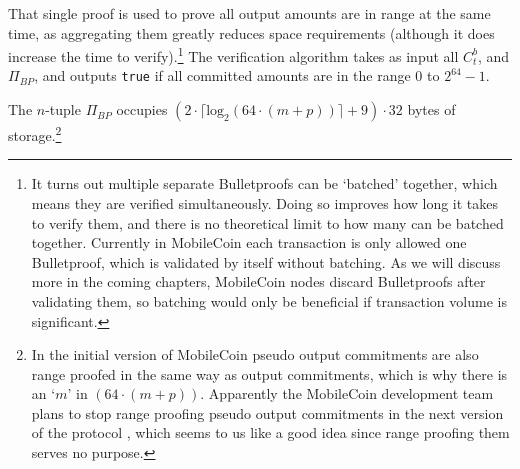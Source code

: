 That single proof is used to prove all output amounts are in range at the same time, as aggregating them greatly reduces space requirements (although it does increase the time to verify).\footnote{It turns out multiple separate Bulletproofs can be `batched' together, which means they are verified simultaneously. Doing so improves how long it takes to verify them, and there is no theoretical limit to how many can be batched together. Currently in MobileCoin each transaction is only allowed one Bulletproof, which is validated by itself without batching. As we will discuss more in the coming chapters, MobileCoin nodes discard Bulletproofs after validating them, so batching would only be beneficial if transaction volume is significant.} The verification algorithm takes as input all $C^b_t$, and $\Pi_{BP}$, and outputs {\tt true} if all committed amounts are in the range 0 to $2^{64} - 1$.

The $n$-tuple $\Pi_{BP}$ occupies $(2 \cdot \lceil \textrm{log}_2(64 \cdot (m + p)) \rceil + 9) \cdot 32$ bytes of storage.\footnote{\label{footnote:commitments-pseudo-output-commit-range-proofs}In the initial version of MobileCoin pseudo output commitments are also range proofed in the same way as output commitments, which is why there is an `$m$' in $(64 \cdot (m + p))$. Apparently the MobileCoin development team plans to stop range proofing pseudo output commitments in the next version of the protocol \cite{mc-pull-request-revert-remove-pseudo-output-from-range-proof}, which seems to us like a good idea since range proofing them serves no purpose.}